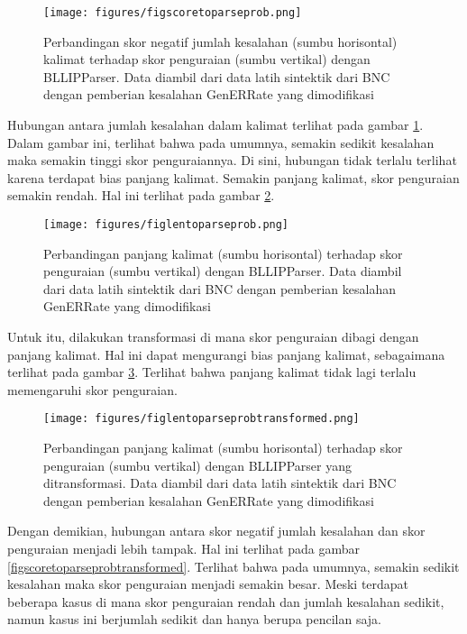 \documentclass[conference]{IEEEtran}
\begin{document}
\begin{figure}[h]
\centerline{\texttt{[image: figures/figscoretoparseprob.png]}}
\caption{Perbandingan skor negatif jumlah kesalahan (sumbu horisontal) kalimat terhadap skor penguraian (sumbu vertikal) dengan BLLIPParser. Data diambil dari data latih sintektik dari BNC dengan pemberian kesalahan GenERRate yang dimodifikasi}
\label{figscoretoparseprob}
\end{figure}

Hubungan antara jumlah kesalahan dalam kalimat terlihat pada gambar \ref{figscoretoparseprob}. Dalam gambar ini, terlihat bahwa pada umumnya, semakin sedikit kesalahan maka semakin tinggi skor penguraiannya. Di sini, hubungan tidak terlalu terlihat karena terdapat bias panjang kalimat. Semakin panjang kalimat, skor penguraian semakin rendah. Hal ini terlihat pada gambar \ref{figlentoparseprob}.

\begin{figure}[h]
\centerline{\texttt{[image: figures/figlentoparseprob.png]}}
\caption{Perbandingan panjang kalimat (sumbu horisontal) terhadap skor penguraian (sumbu vertikal) dengan BLLIPParser. Data diambil dari data latih sintektik dari BNC dengan pemberian kesalahan GenERRate yang dimodifikasi}
\label{figlentoparseprob}
\end{figure}

Untuk itu, dilakukan transformasi di mana skor penguraian dibagi dengan panjang kalimat. Hal ini dapat mengurangi bias panjang kalimat, sebagaimana terlihat pada gambar \ref{figlentoparseprobtransformed}. Terlihat bahwa panjang kalimat tidak lagi terlalu memengaruhi skor penguraian.

\begin{figure}[h]
\centerline{\texttt{[image: figures/figlentoparseprobtransformed.png]}}
\caption{Perbandingan panjang kalimat (sumbu horisontal) terhadap skor penguraian (sumbu vertikal) dengan BLLIPParser yang ditransformasi. Data diambil dari data latih sintektik dari BNC dengan pemberian kesalahan GenERRate yang dimodifikasi}
\label{figlentoparseprobtransformed}
\end{figure}

Dengan demikian, hubungan antara skor negatif jumlah kesalahan dan skor penguraian menjadi lebih tampak. Hal ini terlihat pada gambar \ref{figscoretoparseprobtransformed}. Terlihat bahwa pada umumnya, semakin sedikit kesalahan maka skor penguraian menjadi semakin besar. Meski terdapat beberapa kasus di mana skor penguraian rendah dan jumlah kesalahan sedikit, namun kasus ini berjumlah sedikit dan hanya berupa pencilan saja.
\end{document}
